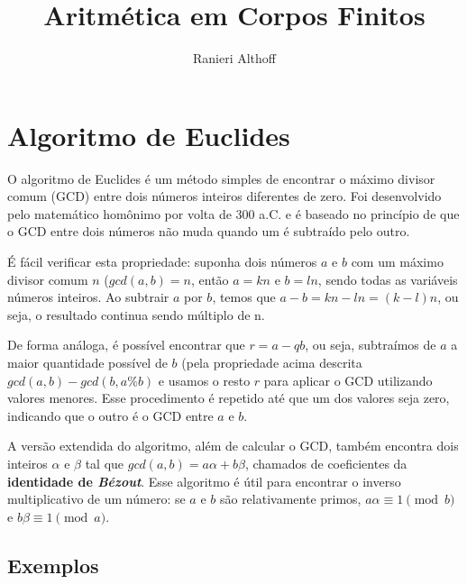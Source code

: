 \documentclass[12pt]{article}
\title{Aritmética em Corpos Finitos}
\author{Ranieri Althoff}
\begin{document}
\maketitle

\section{Algoritmo de Euclides}

O algoritmo de Euclides é um método simples de encontrar o máximo divisor comum
(GCD) entre dois números inteiros diferentes de zero. Foi desenvolvido pelo
matemático homônimo por volta de 300 a.C. e é baseado no princípio de que o
GCD entre dois números não muda quando um é subtraído pelo outro.

É fácil verificar esta propriedade: suponha dois números $a$ e $b$ com um
máximo divisor comum $n$ ($gcd(a, b) = n$, então $a = kn$ e $b = ln$, sendo
todas as variáveis números inteiros. Ao subtrair $a$ por $b$, temos que
$a-b = kn-ln = (k-l)n$, ou seja, o resultado continua sendo múltiplo de n.

De forma análoga, é possível encontrar que $r = a - qb$, ou seja, subtraímos de
$a$ a maior quantidade possível de $b$ (pela propriedade acima descrita
$gcd(a, b) - gcd(b, a {\%} b)$ e usamos o resto $r$ para aplicar o GCD
utilizando valores menores. Esse procedimento é repetido até que um dos valores
seja zero, indicando que o outro é o GCD entre $a$ e $b$.

A versão extendida do algoritmo, além de calcular o GCD, também encontra dois
inteiros $\alpha$ e $\beta$ tal que $gcd(a, b) = a\alpha+b\beta$, chamados de
coeficientes da \textbf{identidade de \textit{Bézout}}. Esse algoritmo é útil
para encontrar o inverso multiplicativo de um número: se $a$ e $b$ são
relativamente primos, $a\alpha \equiv 1 \pmod{b}$ e $b\beta \equiv 1 \pmod{a}$.

\subsection{Exemplos}
\end{document}
